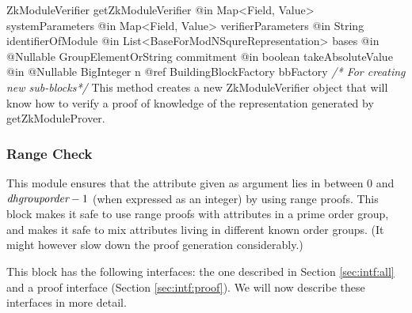       \begin{method}
      {ZkModuleVerifier}
      {getZkModuleVerifier}
      {
        {@in Map<Field, Value> systemParameters}
        {@in Map<Field, Value> verifierParameters}
        {@in String identifierOfModule}
        {@in List<BaseForModNSqureRepresentation> bases}
        {@in @Nullable GroupElementOrString commitment}
        {@in boolean takeAbsoluteValue}
        {@in @Nullable BigInteger n}
        {@ref BuildingBlockFactory bbFactory \textrm{\emph{/* For creating new sub-blocks*/}}}
      }
      This method creates a new ZkModuleVerifier object that will know how to
      verify a proof of knowledge of the representation generated by getZkModuleProver.
      \end{method}
\iffalse
    \subsubsection{Range Check}

    This module ensures that the attribute given as argument lies in
    between 0 and $\emph{dhgrouporder}-1$ (when expressed as an integer)
    by using range proofs. This block makes it safe to use range proofs with
    attributes in a prime order group, and makes it safe to mix attributes living
    in different known order groups. (It might however slow down the proof generation
    considerably.)

    This block has the following interfaces:
    the one described in Section \ref{sec:intf:all}
    and a proof interface (Section \ref{sec:intf:proof}).
      We will now describe these interfaces in more detail.

